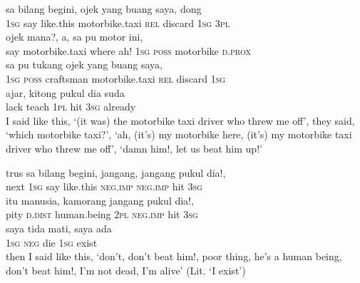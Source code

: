 \ea
\gll   sa    {bilang}    {begini,}    {ojek}    {yang}    {buang}    {saya,}    {dong}\\
  \textsc{1sg}    {say}    {like.this}    {motorbike.taxi}    {\textsc{rel}}    {discard}    {\textsc{1sg}}    {\textsc{3pl}}\\
    {ojek}    {mana?,}   a,    {sa}    {pu}    {motor}   ini,\\
   {say}    {motorbike.taxi}    {where}   ah!    {\textsc{1sg}}    {\textsc{poss}}    {motorbike}   \textsc{d.prox}\\
\gll sa    {pu}    {tukang}    {ojek}    {yang}    {buang}    {saya,}\\
  \textsc{1sg}    {\textsc{poss}}    {craftsman}    {motorbike.taxi}    {\textsc{rel}}    {discard}    {\textsc{1sg}}\\
    {ajar,}    {kitong}    {pukul}    {dia}    {suda}\\
   {lack}    {teach}    {\textsc{1pl}}    {hit}    {\textsc{3sg}}    {already}\\
\glt
I said like this, ‘(it was) the motorbike taxi driver who threw me off’, they said, ‘which motorbike taxi?’, ‘ah, (it’s) my motorbike here, (it’s) my motorbike taxi driver who threw me off’, ‘damn him!, let us beat him up!’
\z

\ea
\gll   trus    {sa}    {bilang}    {begini,}    {jangang,}    {jangang}    {pukul}    {dia!,}\\
  next    {\textsc{1sg}}    {say}    {like.this}    {\textsc{neg.imp}}    {\textsc{neg.imp}}    {hit}    {\textsc{3sg}}\\
    {itu}    {manusia,}    {kamorang}    {jangang}    {pukul}   dia!,\\
   {pity}    {\textsc{d.dist}}    {human.being}    {\textsc{2pl}}    {\textsc{neg.imp}}    {hit}   \textsc{3sg}\\
\gll saya    {tida}    {mati,}    {saya}    {ada}\\
  \textsc{1sg}    {\textsc{neg}}    {die}    {\textsc{1sg}}    {exist}\\
\glt
then I said like this, ‘don’t, don’t beat him!, poor thing, he’s a human being, don’t beat him!, I’m not dead, I’m alive’ (Lit. ‘I exist’)
\z

